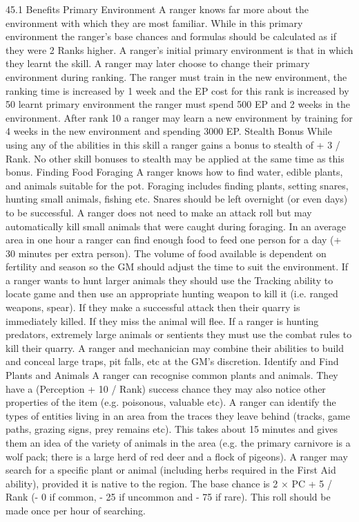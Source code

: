 \documentclass[a4paper]{article}
\begin{document}
\begin{multicols}{3}
45.1 Benefits
Primary Environment
A ranger knows far more about the environment
with which they are most familiar. While in this
primary environment the ranger’s base chances and
formulas should be calculated as if they were 2
Ranks higher. A ranger’s initial primary environment is that in which they learnt the skill. A ranger
may later choose to change their primary environment during ranking.
The ranger must train in the new environment, the
ranking time is increased by 1 week and the EP
cost for this rank is increased by 50%
learnt primary environment the ranger must spend
500 EP and 2 weeks in the environment. After rank
10 a ranger may learn a new environment by training for 4 weeks in the new environment and spending 3000 EP.
Stealth Bonus
While using any of the abilities in this skill a
ranger gains a bonus to stealth of + 3 / Rank. No
other skill bonuses to stealth may be applied at the
same time as this bonus.
Finding Food
Foraging A ranger knows how to find water, edible plants, and animals suitable for the pot. Foraging includes finding plants, setting snares, hunting
small animals, fishing etc. Snares should be left
overnight (or even days) to be successful. A ranger
does not need to make an attack roll but may automatically kill small animals that were caught during foraging.
In an average area in one hour a ranger can find
enough food to feed one person for a day (+ 30
minutes per extra person). The volume of food
available is dependent on fertility and season so the
GM should adjust the time to suit the environment.
If a ranger wants to hunt larger animals they should
use the Tracking ability to locate game and then
use an appropriate hunting weapon to kill it (i.e.
ranged weapons, spear). If they make a successful
attack then their quarry is immediately killed. If
they miss the animal will flee. If a ranger is hunting predators, extremely large animals or sentients
they must use the combat rules to kill their quarry.
A ranger and mechanician may combine their
abilities to build and conceal large traps, pit falls,
etc at the GM’s discretion.
Identify and Find Plants and Animals A ranger
can recognise common plants and animals. They
have a (Perception + 10 / Rank)%
success chance they may also notice other properties of the item (e.g. poisonous, valuable etc).
A ranger can identify the types of entities living in
an area from the traces they leave behind (tracks,
game paths, grazing signs, prey remains etc). This
takes about 15 minutes and gives them an idea of
the variety of animals in the area (e.g. the primary
carnivore is a wolf pack; there is a large herd of red
deer and a flock of pigeons).
A ranger may search for a specific plant or animal
(including herbs required in the First Aid ability),
provided it is native to the region. The base chance
is 2 × PC + 5 / Rank (- 0 if common, - 25 if uncommon and - 75 if rare). This roll should be made
once per hour of searching.


\end{multicols}
\end{document}

